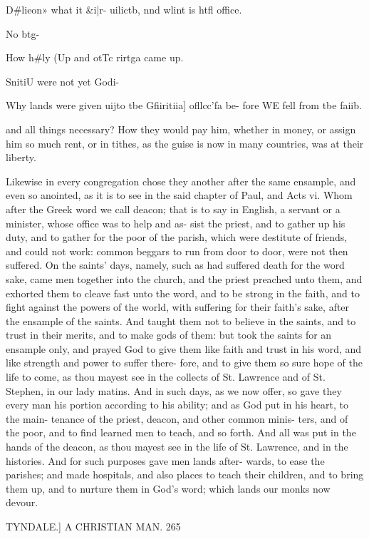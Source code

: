 \documentclass{custom}
\begin{document}
{D#lieon» 
what it &i|r- 
uilictb, nnd 
wlint is htfl 
office. 

No btg- 

How h#ly 
(Up and 
otTc rirtga 
came up. 

SnitiU 
were not 
yet Godi- 

Why lands 
were given 
uijto tbe 
Gfiiritiia] 
ofllcc'fa be- 
fore WE fell 
from tbe 
faiib. 

and all things necessary? How they would pay him, 
whether in money, or assign him so much rent, or in 
tithes, as the guise is now in many countries, was at their 
liberty. 

Likewise in every congregation chose they another after 
the same ensample, and even so anointed, as it is to see 
in the said chapter of Paul, and Acts vi. Whom after 
the Greek word we call deacon; that is to say in English, 
a servant or a minister, whose office was to help and as- 
sist the priest, and to gather up his duty, and to gather for 
the poor of the parish, which were destitute of friends, 
and could not work: common beggars to run from door 
to door, were not then suffered. On the saints' days, 
namely, such as had suffered death for the word sake, 
came men together into the church, and the priest preached 
unto them, and exhorted them to cleave fast unto the word, 
and to be strong in the faith, and to fight against the 
powers of the world, with suffering for their faith's sake, 
after the ensample of the saints. And taught them not to 
believe in the saints, and to trust in their merits, and to 
make gods of them: but took the saints for an ensample 
only, and prayed God to give them like faith and trust 
in his word, and like strength and power to suffer there- 
fore, and to give them so sure hope of the life to come, as 
thou mayest see in the collects of St. Lawrence and of St. 
Stephen, in our lady matins. And in such days, as we 
now offer, so gave they every man his portion according 
to his ability; and as God put in his heart, to the main- 
tenance of the priest, deacon, and other common minis- 
ters, and of the poor, and to find learned men to teach, 
and so forth. And all was put in the hands of the deacon, 
as thou mayest see in the life of St. Lawrence, and in the 
histories. And for such purposes gave men lands after- 
wards, to ease the parishes; and made hospitals, and also 
places to teach their children, and to bring them up, and 
to nurture them in God's word; which lands our monks 
now devour. 


TYNDALE.]
A CHRISTIAN MAN.
265

}
\end{document}

